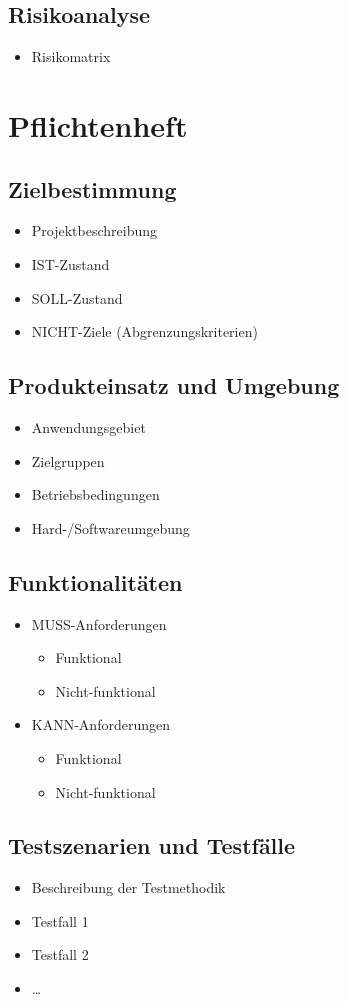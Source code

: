 \subsection{Risikoanalyse}
\begin{itemize}
	\item Risikomatrix
\end{itemize}
\section{Pflichtenheft}
\subsection{Zielbestimmung}
\begin{itemize}
	\item Projektbeschreibung
	\item IST-Zustand
	\item SOLL-Zustand
	\item NICHT-Ziele (Abgrenzungskriterien)
\end{itemize}
\subsection{Produkteinsatz und Umgebung}
\begin{itemize}
	\item Anwendungsgebiet
	\item Zielgruppen
	\item Betriebsbedingungen
	\item Hard-/Softwareumgebung
\end{itemize}
\subsection{Funktionalitäten}
\begin{itemize}
	\item MUSS-Anforderungen
	\begin{itemize}
		\item Funktional
		\item Nicht-funktional
	\end{itemize}
	\item KANN-Anforderungen
	\begin{itemize}
		\item Funktional
		\item Nicht-funktional
	\end{itemize}
\end{itemize}
\subsection{Testszenarien und Testfälle}
\begin{itemize}
	\item Beschreibung der Testmethodik
	\item Testfall 1
	\item Testfall 2
	\item \ldots
\end{itemize}
